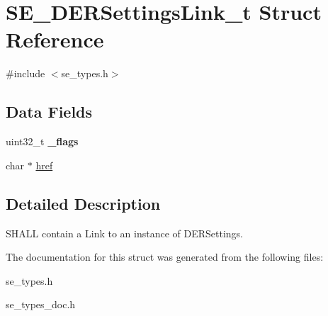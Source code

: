 \hypertarget{structSE__DERSettingsLink__t}{}\section{S\+E\+\_\+\+D\+E\+R\+Settings\+Link\+\_\+t Struct Reference}
\label{structSE__DERSettingsLink__t}


{\ttfamily \#include $<$se\+\_\+types.\+h$>$}

\subsection*{Data Fields}
\begin{DoxyCompactItemize}
\item 
uint32\+\_\+t {\bfseries \+\_\+flags}
\item 
char $\ast$ \hyperlink{group__DERSettingsLink_gac10ce9888bd10f208a2968aba046bef5}{href}
\end{DoxyCompactItemize}


\subsection{Detailed Description}
S\+H\+A\+LL contain a Link to an instance of D\+E\+R\+Settings. 

The documentation for this struct was generated from the following files\+:\begin{DoxyCompactItemize}
\item 
se\+\_\+types.\+h\item 
se\+\_\+types\+\_\+doc.\+h\end{DoxyCompactItemize}
